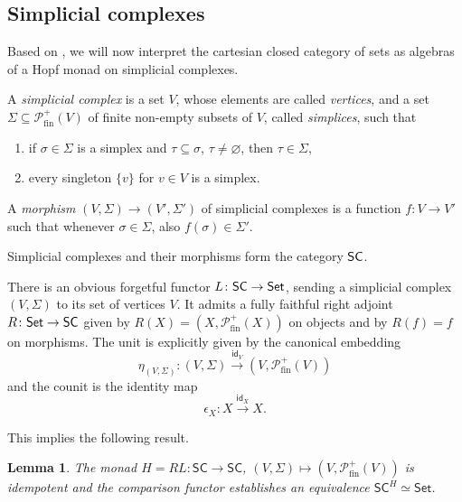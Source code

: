 \documentclass[12pt,dvipsnames,oneside]{amsart}
\theoremstyle{plain}
\newtheorem{lemma}[proposition]{Lemma}
\theoremstyle{remark}
\theoremstyle{definition}
\DeclareMathOperator{\id}{\mathsf{id}}
\newcommand*{\from}{\colon}
\newcommand{\Set}{\mathsf{Set}}
\newcommand{\cP}{\mathcal{P}}
\begin{document}
\subsection{Simplicial complexes}\label{sec:simplicial complexes}
Based on \cite[Chapter IV, \S7]{Eilenberg-Kelly}, we will now interpret the cartesian closed category of sets as algebras of a Hopf monad on simplicial complexes.

\begin{definition}\label{def:simplicial-complex}
  A \emph{simplicial complex} is a set \(V\), whose elements are called \emph{vertices}, and a set \(\Sigma \subseteq \cP_{\mathrm{fin}}^{+}(V)\) of finite non-empty subsets of \(V\), called \emph{simplices}, such that
  \begin{enumerate}[leftmargin=0.8cm]
    \item if \(\sigma \in \Sigma\) is a simplex and \(\tau \subseteq \sigma\), \(\tau \neq \varnothing\), then \(\tau \in \Sigma\),
    \item every singleton \(\{v\}\) for \(v \in V\) is a simplex.
  \end{enumerate}

  A \emph{morphism} \((V,\Sigma) \to (V',\Sigma')\) of simplicial complexes is a function \(f \colon V \to V'\) such that whenever \(\sigma \in \Sigma\), also \(f(\sigma) \in \Sigma'\).

  Simplicial complexes and their morphisms form the category  \({\sf SC}\).
\end{definition}

There is an obvious forgetful functor \(L \colon {\sf SC} \to {\sf Set}\), sending a simplicial complex \((V, \Sigma)\) to its set of vertices \(V\).
It admits a fully faithful right adjoint \(R \colon {\sf Set} \to {\sf SC}\) given by \(R(X) = (X,\cP_{\mathrm{fin}}^{+}(X))\) on objects and by \(R(f) = f\) on morphisms. The unit is explicitly given by the canonical embedding
\[
  \eta_{(V,\Sigma)} \colon (V,\Sigma) \xrightarrow{\id_V} (V,\cP_{\mathrm{fin}}^{+}(V))
\]
and the counit is the identity map
\[
  \epsilon_{X} \colon X \xrightarrow{\id_X} X.
\]

This implies the following result.
\begin{lemma}\label{lem:reflective-subcategory}
  The monad  \(H = RL \from \mathsf{SC}\to \mathsf{SC}\), \((V, \Sigma) \mapsto (V, \cP_{\mathrm{fin}}^{+}(V))\) is idempotent and the comparison functor establishes an equivalence \(\mathsf{SC}^H \simeq \Set\).
\end{lemma}
\end{document}
